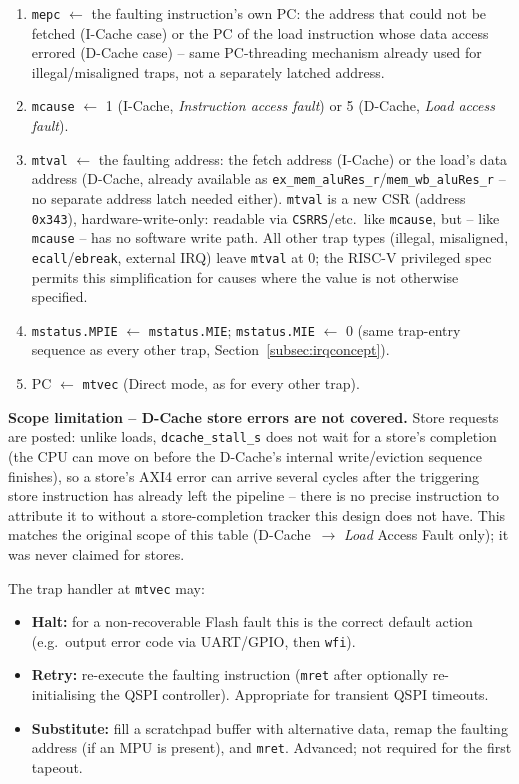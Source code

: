 \begin{enumerate}
  \item \texttt{mepc} $\leftarrow$ the faulting instruction's own PC:
    the address that could not be fetched (I-Cache case) or the PC of the
    load instruction whose data access errored (D-Cache case) -- same
    PC-threading mechanism already used for illegal/misaligned traps, not
    a separately latched address.
  \item \texttt{mcause} $\leftarrow$ 1 (I-Cache, \textit{Instruction
    access fault}) or 5 (D-Cache, \textit{Load access fault}).
  \item \texttt{mtval} $\leftarrow$ the faulting address: the fetch
    address (I-Cache) or the load's data address (D-Cache, already
    available as \texttt{ex\_mem\_aluRes\_r}/\texttt{mem\_wb\_aluRes\_r}
    -- no separate address latch needed either). \texttt{mtval} is a new
    CSR (address \texttt{0x343}), hardware-write-only: readable via
    \texttt{CSRRS}/etc.\ like \texttt{mcause}, but -- like \texttt{mcause}
    -- has no software write path. All other trap types (illegal,
    misaligned, \texttt{ecall}/\texttt{ebreak}, external IRQ) leave
    \texttt{mtval} at 0; the RISC-V privileged spec permits this
    simplification for causes where the value is not otherwise specified.
  \item \texttt{mstatus.MPIE} $\leftarrow$ \texttt{mstatus.MIE};
    \texttt{mstatus.MIE} $\leftarrow$ 0 (same trap-entry sequence as every
    other trap, Section~\ref{subsec:irqconcept}).
  \item PC $\leftarrow$ \texttt{mtvec} (Direct mode, as for every other trap).
\end{enumerate}

\textbf{Scope limitation -- D-Cache store errors are not covered.} Store
requests are posted: unlike loads, \texttt{dcache\_stall\_s} does not wait
for a store's completion (the CPU can move on before the D-Cache's
internal write/eviction sequence finishes), so a store's AXI4 error can
arrive several cycles after the triggering store instruction has already
left the pipeline -- there is no precise instruction to attribute it to
without a store-completion tracker this design does not have. This matches
the original scope of this table (D-Cache~$\rightarrow$
\textit{Load} Access Fault only); it was never claimed for stores.

The trap handler at \texttt{mtvec} may:

\begin{itemize}
  \item \textbf{Halt:} for a non-recoverable Flash fault this is the
    correct default action (e.g.\ output error code via UART/GPIO,
    then \texttt{wfi}).
  \item \textbf{Retry:} re-execute the faulting instruction
    (\texttt{mret} after optionally re-initialising the QSPI controller).
    Appropriate for transient QSPI timeouts.
  \item \textbf{Substitute:} fill a scratchpad buffer with alternative
    data, remap the faulting address (if an MPU is present), and
    \texttt{mret}.
    Advanced; not required for the first tapeout.
\end{itemize}

